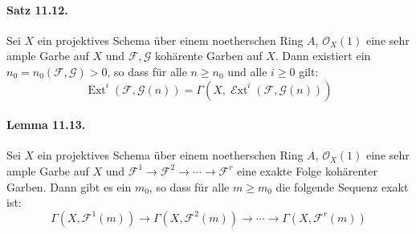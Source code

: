\paragraph{Satz 11.12.}\label{11.12} Sei $X$ ein projektives Schema über einem noetherschen Ring $A$, $\mathcal{O}_X(1)$ eine sehr ample Garbe auf $X$ und $\mathcal{F},\mathcal{G}$ kohärente Garben auf $X$. Dann existiert ein $n_0=n_0(\mathcal{F},\mathcal{G})>0$, so dass für alle $n\geq n_0$ und alle $i\geq 0$ gilt:
\[\operatorname{Ext}^i(\mathcal{F},\mathcal{G}(n)) =\Gamma(X,\operatorname{\mathcal{E}xt}^i(\mathcal{F},\mathcal{G}(n))) \]

\paragraph{Lemma 11.13.}\label{11.13} Sei $X$ ein projektives Schema über einem noetherschen Ring $A$, $\mathcal{O}_X(1)$ eine sehr ample Garbe auf $X$ und $\mathcal{F}^1\to\mathcal{F}^2\to\cdots\to\mathcal{F}^r$ eine exakte Folge kohärenter Garben. Dann gibt es ein $m_0$, so dass für alle $m\geq m_0$ die folgende Sequenz exakt ist:
\[\Gamma(X,\mathcal{F}^1(m))\longrightarrow\Gamma(X,\mathcal{F}^2(m))\longrightarrow\cdots\longrightarrow\Gamma(X,\mathcal{F}^r(m)) \]

